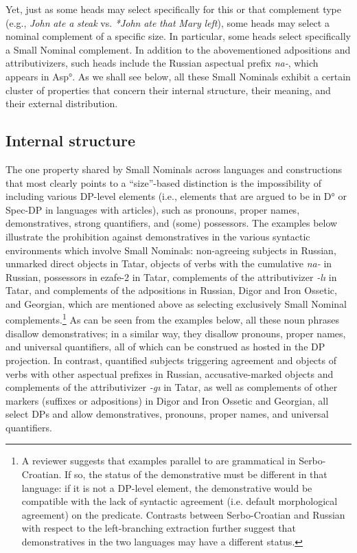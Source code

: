\documentclass[output=paper]{langsci/langscibook}
\begin{document}
Yet, just as some heads may select specifically for this or that complement type (e.g., \textit{John} \textit{ate} \textit{a} \textit{steak} vs. \textit{*John} \textit{ate} \textit{that} \textit{Mary} \textit{left}), some heads may select a nominal complement of a specific size. In particular, some heads select specifically a Small Nominal complement. In addition to the abovementioned adpositions and attributivizers, such heads include the Russian aspectual prefix \textit{na-}, which appears in Asp°. As we shall see below, all these Small Nominals exhibit a certain cluster of properties that concern their internal structure, their meaning, and their external distribution.

\subsection{Internal structure}  %

The one property shared by Small Nominals across languages and constructions that most clearly points to a “size”-based distinction is the impossibility of including various DP-level elements (i.e., elements that are argued to be in D° or Spec-DP in languages with articles), such as pronouns, proper names, demonstratives, strong quantifiers, and (some) possessors. The examples below illustrate the prohibition against demonstratives in the various syntactic environments which involve Small Nominals: non-agreeing subjects in Russian, unmarked direct objects in Tatar, objects of verbs with the cumulative \textit{na-} in Russian, possessors in ezafe-2 in Tatar, complements of the attributivizer \textit{{}-lı} in Tatar, and complements of the adpositions in Russian, Digor and Iron Ossetic, and Georgian, which are mentioned above as selecting exclusively Small Nominal complements.\footnote{A reviewer suggests that examples parallel to  are grammatical in Serbo-Croatian. If so, the status of the demonstrative must be different in that language: if it is not a DP-level element, the demonstrative would be compatible with the lack of syntactic agreement (i.e. default morphological agreement) on the predicate. Contrasts between Serbo-Croatian and Russian with respect to the left-branching extraction further suggest that demonstratives in the two languages may have a different status.} As can be seen from the examples below, all these noun phrases disallow demonstratives; in a similar way, they disallow pronouns, proper names, and universal quantifiers, all of which can be construed as hosted in the DP projection. In contrast, quantified subjects triggering agreement and objects of verbs with other aspectual prefixes in Russian, accusative-marked objects and complements of the attributivizer \textit{{}-gı} in Tatar, as well as complements of other markers (suffixes or adpositions) in Digor and Iron Ossetic and Georgian, all select DPs and allow demonstratives, pronouns, proper names, and universal quantifiers.
\end{document}
